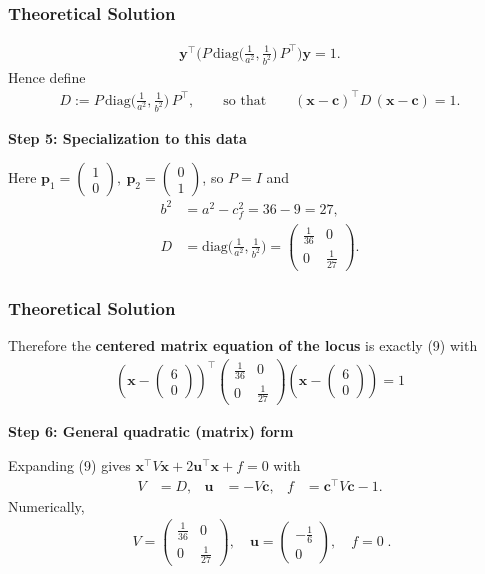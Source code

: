 \documentclass{beamer}
\theoremstyle{remark}
\newcommand{\myvec}[1]{\ensuremath{\begin{pmatrix}#1\end{pmatrix}}}
\let\vec\mathbf
\numberwithin{equation}{section}
\begin{document}
\begin{frame}
\frametitle{Theoretical Solution}
\begin{align}
\vec y^\top \Big(P\,\mathrm{diag}\!\big(\tfrac{1}{a^2},\tfrac{1}{b^2}\big)\,P^\top\Big)\vec y = 1.
\end{align}
Hence define
\begin{align}
D := P\,\mathrm{diag}\!\Big(\tfrac{1}{a^2},\tfrac{1}{b^2}\Big)\,P^\top,
\qquad\text{so that}\qquad
(\vec x-\vec c)^\top D\,(\vec x-\vec c)=1. 
\end{align}

\textbf{Step 5: Specialization to this data}

Here $\vec p_1=\myvec{1\\0},\ \vec p_2=\myvec{0\\1}$, so $P=I$ and
\begin{align}
b^2 &= a^2-c_f^2 = 36-9=27, \\
D &= \mathrm{diag}\!\Big(\tfrac{1}{a^2},\tfrac{1}{b^2}\Big)
= \myvec{\tfrac{1}{36}&0\\[2pt]0&\tfrac{1}{27}}.
\end{align}

\end{frame}

\begin{frame}
\frametitle{Theoretical Solution}
Therefore the \textbf{centered matrix equation of the locus} is exactly (9) with
\begin{align}
\boxed{\;(\vec x-\myvec{6\\0})^\top
\myvec{\tfrac{1}{36}&0\\[2pt]0&\tfrac{1}{27}}
(\vec x-\myvec{6\\0})=1\;}
\end{align}

\textbf{Step 6: General quadratic (matrix) form}

Expanding (9) gives $\vec x^\top V\vec x+2\vec u^\top\vec x+f=0$ with
\begin{align}
V &= D, &
\vec u &= -V\vec c, &
f &= \vec c^\top V\vec c - 1.
\end{align}
Numerically,
\begin{align}
\boxed{\;
V=\myvec{\tfrac{1}{36}&0\\[2pt]0&\tfrac{1}{27}},\quad
\vec u=\myvec{-\tfrac{1}{6}\\[2pt]0},\quad
f=0\; }.
\end{align}

\end{frame}
\end{document}
